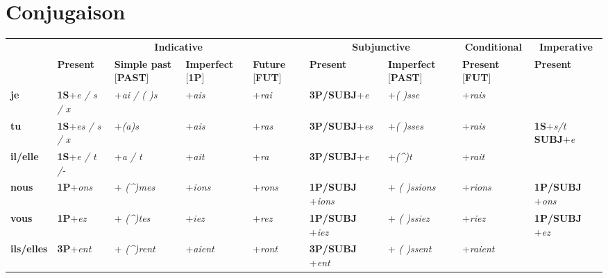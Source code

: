 \documentclass[UTF8]{report}
\begin{document}
\section{Conjugaison}
\begin{table}[H]
\centering
\small
\setlength{\tabcolsep}{3pt}
\renewcommand{\arraystretch}{1.2}

\begin{tabularx}{\textwidth}{|l|X|X|X|X|X|X|X|X|}
\hline
\rowcolor{cyan!20}
\multicolumn{1}{|c|}{} & \multicolumn{4}{c|}{\textbf{Indicative}} & \multicolumn{2}{c|}{\textbf{Subjunctive}} & \multicolumn{1}{c|}{\textbf{Conditional}} & \multicolumn{1}{c|}{\textbf{Imperative}} \\
\cline{2-9}
\rowcolor{cyan!20}
\multicolumn{1}{|c|}{} & \textbf{Present} & \textbf{Simple past} [\textbf{PAST}] & \textbf{Imperfect} [\textbf{1P}] & \textbf{Future} [\textbf{FUT}] & \textbf{Present} & \textbf{Imperfect} [\textbf{PAST}] & \textbf{Present} [\textbf{FUT}] & \textbf{Present} \\
\hline
\textbf{je} & \textbf{1S}+\textit{e / s / x} & +\textit{ai / ( )s} & +\textit{ais} & +\textit{rai} & \textbf{3P/SUBJ}+\textit{e} &  +\textit{( )sse} & +\textit{rais} & \\
\hline
\textbf{tu} & \textbf{1S}+\textit{es / s / x} & +\textit{(a)s} & +\textit{ais} & +\textit{ras} & \textbf{3P/SUBJ}+\textit{es} & +\textit{( )sses} & +\textit{rais} & \textbf{1S}+\textit{s/t} \textbf{SUBJ}+\textit{e}\\
\hline
\textbf{il/elle} & \textbf{1S}+\textit{e / t /-} & +\textit{a / t} & +\textit{ait} & +\textit{ra} & \textbf{3P/SUBJ}+\textit{e} & +\textit{(\^{})t} & +\textit{rait} & \\
\hline
\textbf{nous} & \textbf{1P}+\textit{ons} & + \textit{(\^{})mes} & +\textit{ions} & +\textit{rons} & \textbf{1P/SUBJ} +\textit{ions}& + \textit{( )ssions} & +\textit{rions} & \textbf{1P/SUBJ} +\textit{ons} \\
\hline
\textbf{vous} & \textbf{1P}+\textit{ez} & + \textit{(\^{})tes} & +\textit{iez} & +\textit{rez} & \textbf{1P/SUBJ} +\textit{iez} & + \textit{( )ssiez} & +\textit{riez} & \textbf{1P/SUBJ} +\textit{ez} \\
\hline
\textbf{ils/elles} & \textbf{3P}+\textit{ent} & + \textit{(\^{})rent} & +\textit{aient} & +\textit{ront} & \textbf{3P/SUBJ} +\textit{ent} & + \textit{( )ssent} & +\textit{raient} & \\
\hline
\end{tabularx}
\end{table}
\end{document}
